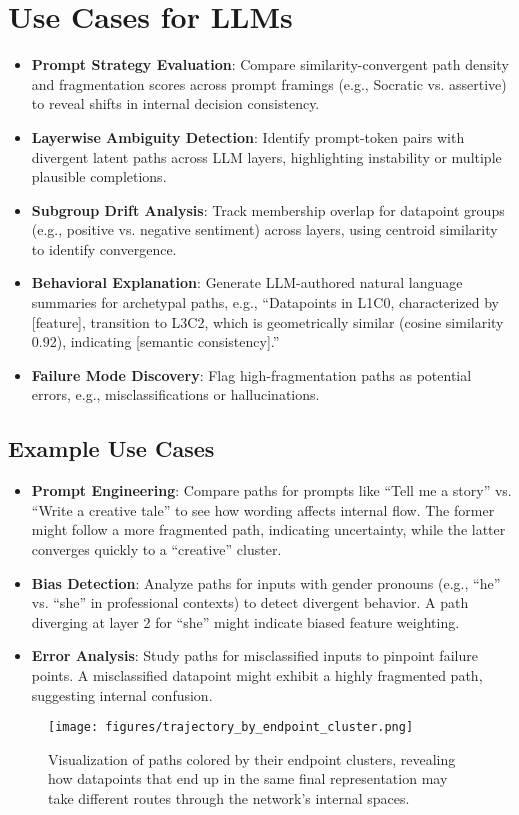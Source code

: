 \section{Use Cases for LLMs}

\begin{itemize}
    \item \textbf{Prompt Strategy Evaluation}: Compare similarity-convergent path density and fragmentation scores across prompt framings (e.g., Socratic vs. assertive) to reveal shifts in internal decision consistency.
    \item \textbf{Layerwise Ambiguity Detection}: Identify prompt-token pairs with divergent latent paths across LLM layers, highlighting instability or multiple plausible completions.
    \item \textbf{Subgroup Drift Analysis}: Track membership overlap for datapoint groups (e.g., positive vs. negative sentiment) across layers, using centroid similarity to identify convergence.
    \item \textbf{Behavioral Explanation}: Generate LLM-authored natural language summaries for archetypal paths, e.g., ``Datapoints in L1C0, characterized by [feature], transition to L3C2, which is geometrically similar (cosine similarity 0.92), indicating [semantic consistency].''
    \item \textbf{Failure Mode Discovery}: Flag high-fragmentation paths as potential errors, e.g., misclassifications or hallucinations.
\end{itemize}

\subsection{Example Use Cases}

\begin{itemize}
    \item \textbf{Prompt Engineering}: Compare paths for prompts like ``Tell me a story'' vs. ``Write a creative tale'' to see how wording affects internal flow. The former might follow a more fragmented path, indicating uncertainty, while the latter converges quickly to a ``creative'' cluster.
    \item \textbf{Bias Detection}: Analyze paths for inputs with gender pronouns (e.g., ``he'' vs. ``she'' in professional contexts) to detect divergent behavior. A path diverging at layer 2 for ``she'' might indicate biased feature weighting.
    \item \textbf{Error Analysis}: Study paths for misclassified inputs to pinpoint failure points. A misclassified datapoint might exhibit a highly fragmented path, suggesting internal confusion.
\end{itemize}

\begin{figure}[ht]
    \centering
    \texttt{[image: figures/trajectory\_by\_endpoint\_cluster.png]}
    \caption{Visualization of paths colored by their endpoint clusters, revealing how datapoints that end up in the same final representation may take different routes through the network's internal spaces.}
    \label{fig:trajectory_endpoint}
\end{figure}